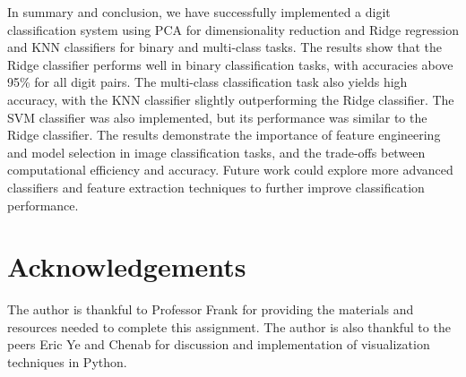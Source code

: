 \documentclass[11pt]{amsart}
\begin{document}
In summary and conclusion, we have successfully implemented a digit classification system using PCA for dimensionality reduction and Ridge regression and KNN classifiers for binary and multi-class tasks. The results show that the Ridge classifier performs well in binary classification tasks, with accuracies above 95\% for all digit pairs. The multi-class classification task also yields high accuracy, with the KNN classifier slightly outperforming the Ridge classifier. The SVM classifier was also implemented, but its performance was similar to the Ridge classifier. The results demonstrate the importance of feature engineering and model selection in image classification tasks, and the trade-offs between computational efficiency and accuracy. Future work could explore more advanced classifiers and feature extraction techniques to further improve classification performance.

\section*{Acknowledgements}

The author is thankful to Professor Frank for providing the materials and resources needed to complete this assignment. The author is also thankful to the peers Eric Ye and Chenab for discussion and implementation of visualization techniques in Python.



\end{document}
